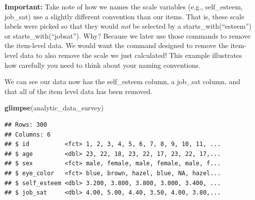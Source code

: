\documentclass[
]{krantz}
\makeatletter
\newenvironment{Shaded}{\begin{snugshade}}{\end{snugshade}}
\newcommand{\DataTypeTok}[1]{\textcolor[rgb]{0.27,0.27,0.27}{#1}}
\newcommand{\KeywordTok}[1]{\textcolor[rgb]{0.27,0.27,0.27}{\textbf{#1}}}
\newcommand{\NormalTok}[1]{#1}
\newcommand{\OperatorTok}[1]{\textcolor[rgb]{0.43,0.43,0.43}{\textbf{#1}}}
\newcommand{\OtherTok}[1]{\textcolor[rgb]{0.37,0.37,0.37}{#1}}
\newcommand{\StringTok}[1]{\textcolor[rgb]{0.5,0.5,0.5}{#1}}
\newenvironment{kframe}{%
\medskip{}
\setlength{\fboxsep}{.8em}
 \def\at@end@of@kframe{}%
 \ifinner\ifhmode%
  \def\at@end@of@kframe{\end{minipage}}%
  \begin{minipage}{\columnwidth}%
 \fi\fi%
 \def\FrameCommand##1{\hskip\@totalleftmargin \hskip-\fboxsep
 \colorbox{shadecolor}{##1}\hskip-\fboxsep
     \hskip-\linewidth \hskip-\@totalleftmargin \hskip\columnwidth}%
 \MakeFramed {\advance\hsize-\width
   \@totalleftmargin\z@ \linewidth\hsize
   \@setminipage}}%
 {\par\unskip\endMakeFramed%
 \at@end@of@kframe}
\renewenvironment{Shaded}{\begin{kframe}}{\end{kframe}}
\makeatother
\begin{document}
\textbf{Important:} Take note of how we names the scale variables (e.g., self\_esteem, job\_sat) use a slightly different convention than our items. That is, these scale labels were picked so that they would \emph{not} be selected by a starts\_with(``esteem'') or starts\_with(``jobsat''). Why? Because we later use those commands to remove the item-level data. We would want the command designed to remove the item-level data to also remove the scale we just calculated! This example illustrates how carefully you need to think about your naming conventions.

\begin{Shaded}
\end{Shaded}

We can see our data now has the self\_esteem column, a job\_sat column, and that all of the item level data has been removed.

\begin{Shaded}
\begin{Highlighting}[]
\KeywordTok{glimpse}\NormalTok{(analytic_data_survey)}
\end{Highlighting}
\end{Shaded}

\begin{verbatim}
## Rows: 300
## Columns: 6
## $ id          <fct> 1, 2, 3, 4, 5, 6, 7, 8, 9, 10, 11, ...
## $ age         <dbl> 23, 22, 18, 23, 22, 17, 23, 22, 17,...
## $ sex         <fct> male, female, male, female, male, f...
## $ eye_color   <fct> blue, brown, hazel, blue, NA, hazel...
## $ self_esteem <dbl> 3.200, 3.800, 3.800, 3.000, 3.400, ...
## $ job_sat     <dbl> 4.00, 5.00, 4.40, 3.50, 4.00, 3.80,...
\end{verbatim}
\end{document}
